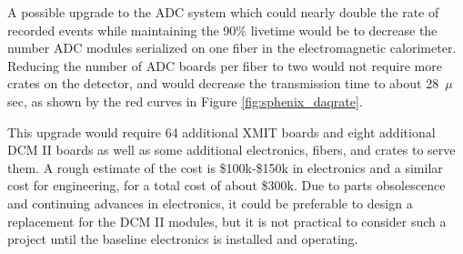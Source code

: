 A possible upgrade to the ADC system which could nearly double the
rate of recorded events while maintaining the 90\% livetime would be
to decrease the number ADC modules serialized on one fiber in the
electromagnetic calorimeter.  Reducing the number of ADC boards per
fiber to two would not require more crates on the detector, and would
decrease the transmission time to about 28~$\mu$sec, as shown by the
red curves in Figure \ref{fig:sphenix_daqrate}.

This upgrade would require 64 additional XMIT boards and eight
additional DCM II boards as well as some additional electronics, fibers,
and crates to serve them.  A rough estimate of the cost is
\$100k-\$150k in electronics and a similar cost for engineering, for a
total cost of about \$300k.  Due to parts obsolescence and continuing
advances in electronics, it could be preferable to design a
replacement for the DCM II modules, but it is not practical to consider such a
project until the baseline electronics is installed and operating.



